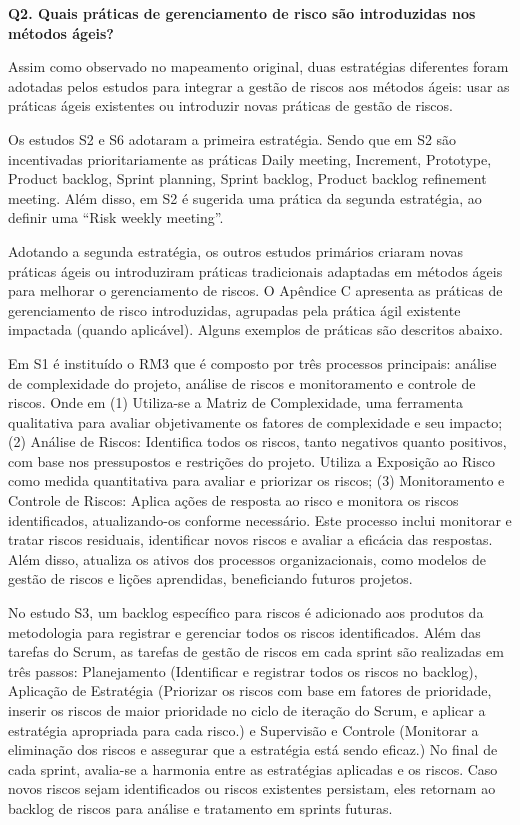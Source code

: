 \documentclass[
	12pt,
	openright,
	twoside,
	a4paper,
	english,
	brazil
	]{abntex2}
\begin{document}
\textbf{Q2. Quais práticas de gerenciamento de risco são introduzidas nos métodos ágeis?}

Assim como observado no mapeamento original, duas estratégias diferentes foram adotadas pelos estudos para integrar a gestão de riscos aos métodos ágeis: usar as práticas ágeis existentes ou introduzir novas práticas de gestão de riscos.

Os estudos S2 e S6 adotaram a primeira estratégia. Sendo que em S2 são incentivadas prioritariamente as práticas Daily meeting, Increment, Prototype, Product backlog, Sprint planning, Sprint backlog, Product backlog refinement meeting. Além disso, em S2 é sugerida uma prática da segunda estratégia, ao definir uma “Risk weekly meeting”.

Adotando a segunda estratégia, os outros estudos primários criaram novas práticas ágeis ou introduziram práticas tradicionais adaptadas em métodos ágeis para melhorar o gerenciamento de riscos. O Apêndice C apresenta as práticas de gerenciamento de risco introduzidas, agrupadas pela prática ágil existente impactada (quando aplicável). Alguns exemplos de práticas são descritos abaixo.

Em S1 é instituído o RM3 que é composto por três processos principais: análise de complexidade do projeto, análise de riscos e monitoramento e controle de riscos. Onde em (1) Utiliza-se a Matriz de Complexidade, uma ferramenta qualitativa para avaliar objetivamente os fatores de complexidade e seu impacto; (2) Análise de Riscos: Identifica todos os riscos, tanto negativos quanto positivos, com base nos pressupostos e restrições do projeto. Utiliza a Exposição ao Risco como medida quantitativa para avaliar e priorizar os riscos; (3) Monitoramento e Controle de Riscos: Aplica ações de resposta ao risco e monitora os riscos identificados, atualizando-os conforme necessário. Este processo inclui monitorar e tratar riscos residuais, identificar novos riscos e avaliar a eficácia das respostas. Além disso, atualiza os ativos dos processos organizacionais, como modelos de gestão de riscos e lições aprendidas, beneficiando futuros projetos.

No estudo S3, um backlog específico para riscos é adicionado aos produtos da metodologia para registrar e gerenciar todos os riscos identificados. Além das tarefas do Scrum, as tarefas de gestão de riscos em cada sprint são realizadas em três passos: Planejamento (Identificar e registrar todos os riscos no backlog), Aplicação de Estratégia (Priorizar os riscos com base em fatores de prioridade, inserir os riscos de maior prioridade no ciclo de iteração do Scrum, e aplicar a estratégia apropriada para cada risco.) e Supervisão e Controle (Monitorar a eliminação dos riscos e assegurar que a estratégia está sendo eficaz.) No final de cada sprint, avalia-se a harmonia entre as estratégias aplicadas e os riscos. Caso novos riscos sejam identificados ou riscos existentes persistam, eles retornam ao backlog de riscos para análise e tratamento em sprints futuras.
\end{document}
